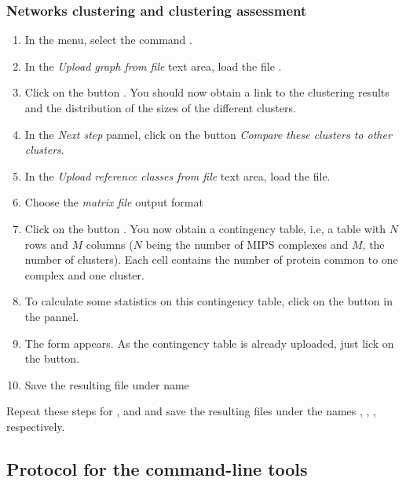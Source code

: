 \subsubsection{Networks clustering and clustering assessment}

\begin{enumerate}

\item In the \neat menu, select the command . 
\item In the \textit{Upload graph from file} text area, load the file .
\item Click on the button . You should now obtain a link to the clustering results and the distribution of the sizes of the different clusters.
\item In the \textit{Next step} pannel, click on the button \textit{Compare these clusters to other clusters}.
\item In the \textit{Upload reference classes from file } text area, load the  file.
\item Choose the \textit{matrix file} output format
\item Click on the button . You now obtain a contingency table, i.e, a table with $N$ rows and $M$ columns ($N$ being the number of MIPS complexes and $M$, the number of clusters). Each cell contains the number of protein common to one complex and one cluster.
\item To calculate some statistics on this contingency table, click on the  button in the  pannel.
\item The  form appears. As the contingency table is already uploaded, just lick on the  button. 
\item Save the resulting file under name   

\end{enumerate}

Repeat these steps for ,  and  and save the resulting files under the names , , , respectively.


\subsection{Protocol for the command-line tools}

